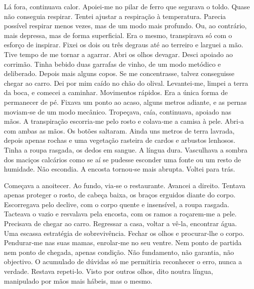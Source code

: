 Lá fora, continuava calor. Apoiei­‑me no pilar de ferro que segurava o
toldo. Quase não conseguia respirar. Tentei ajustar a respiração à
temperatura. Parecia possível respirar menos vezes, mas de um modo mais
profundo. Ou, ao contrário, mais depressa, mas de forma superficial. Era
o mesmo, transpirava só com o esforço de inspirar. Fixei os dois ou três
degraus até ao terreiro e larguei a mão. Tive tempo de me tornar a
agarrar. Abri os olhos devagar. Desci apoiado ao corrimão. Tinha bebido
duas garrafas de vinho, de um modo metódico e deliberado. Depois mais
alguns copos. Se me concentrasse, talvez conseguisse chegar ao carro.
Dei por mim caído no chão do olival. Levantei­‑me, limpei a terra da
boca, e comecei a caminhar. Movimentos rápidos. Era a única forma de
permanecer de pé. Fixava um ponto ao acaso, alguns metros adiante, e as
pernas moviam­‑se de um modo mecânico. Tropeçava, caía, continuava,
apoiado nas mãos. A transpiração escorria­‑me pelo rosto e colava­‑me a
camisa à pele. Abri­‑a com ambas as mãos. Os botões saltaram. Ainda uns
metros de terra lavrada, depois apenas rochas e uma vegetação rasteira
de cardos e arbustos lenhosos. Tinha a roupa rasgada, os dedos em
sangue. A língua dura. Vasculhava a sombra dos maciços calcários como se
aí se pudesse esconder uma fonte ou um resto de humidade. Não escondia.
A encosta tornou­‑se mais abrupta. Voltei para trás.

Começava a anoitecer. Ao fundo, via­‑se o restaurante. Avancei a
direito. Tentava apenas proteger o rosto, de cabeça baixa, os braços
erguidos diante do corpo. Escorregava pelo declive, com o corpo quente e
insensível, a roupa rasgada. Tacteava o vazio e resvalava pela encosta,
com os ramos a roçarem­‑me a pele. Precisava de chegar ao carro.
Regressar a casa, voltar a vê­‑la, encontrar água. Uma escassa
estratégia de sobrevivência. Fechar os olhos e procurar­‑lhe o corpo.
Pendurar­‑me nas suas mamas, enrolar­‑me no seu ventre. Nem ponto de
partida nem ponto de chegada, apenas condição. Não fundamento, não
garantia, não objectivo. O acumulado de dúvidas só me permitiria
reconhecer o erro, nunca a verdade. Restava repeti­‑lo. Visto por outros
olhos, dito noutra língua, manipulado por mãos mais hábeis, mas o mesmo.

